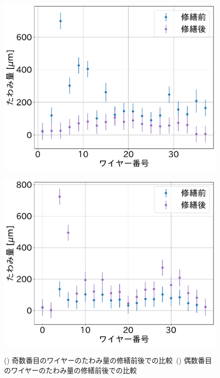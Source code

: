 \documentclass[../../main.tex]{subfiles}
\begin{document}
\begin{figure}[H]
    \begin{minipage}[b]{0.5\hsize}
        \centering
        \includegraphics[width=1.0\textwidth]{wiresag_swg/swg_sag_odd_comparison.pdf}
        \subcaption{}
        \label{fig:wiresag_swg_sag_odd_comparison}
    \end{minipage}
    \begin{minipage}[b]{0.5\hsize}
        \centering
        \includegraphics[width=1.0\textwidth]{wiresag_swg/swg_sag_even_comparison.pdf}
        \subcaption{}
        \label{fig:wiresag_swg_sag_even_comparison}
    \end{minipage}
    \caption{() 奇数番目のワイヤーのたわみ量の修繕前後での比較\ 
             () 偶数番目のワイヤーのたわみ量の修繕前後での比較}
    \label{fig:wiresag_swg_even_odd_repair_comparison}
\end{figure}
\end{document}
